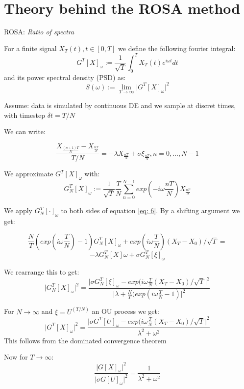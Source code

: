\documentclass[%
thesis=student,%
coverpage=false,%
titlepage=false,%
headmarks=true, %
german,%
font=libertine, %
math=newpxtx, %
BCOR=5mm,%
coverBCOR=11mm%
]{tumbook}
\begin{document}
\chapter{Theory behind the ROSA method}

ROSA: \textit{Ratio of spectra}

For a finite signal $X_{T}(t), t \in [0,T]$ we define the following fourier integral:
    \[
    G^{T}[X]_{\omega} := \frac{1}{\sqrt{T}}\int_{0}^{T}X_{T}(t)e^{i\omega t}dt
    \]
    and its power spectral density (PSD) as: 
    \[
    S(\omega) := \lim_{T\rightarrow\infty} \lvert G^{T}[X]_{\omega}\rvert ^2
    \]

Assume: data is simulated by continuous DE and we sample at discret times, with timestep $\delta t = T/N$

We can write: 
        
        \begin{equation}  
        \frac{X_{\frac{(n+1)T}{N}}-X_{\frac{nT}{N}}}{T/N} = -\lambda X_{\frac{nT}{N}} + \sigma \xi_{\frac{nT}{N}}, n = 0, \dots, N-1 \label{eq: 6}
        \end{equation}


We approximate $G^{T}[X]_{\omega}$ with: 
        \[
        G_{N}^{T}[X]_{\omega}:= \frac{1}{\sqrt{T}}\frac{T}{N}\sum_{n=0}^{N-1}exp(-i\omega\frac{nT}{N})X_{\frac{nT}{N}}
        \]


We apply $G_{N}^{T}[\cdot]_{\omega}$ to both sides of equation \ref{eq: 6}. By a shifting argument we get: 
        
    \[
    \frac{N}{T}(exp(i\omega\frac{T}{N})-1)G_{N}^{T}[X]_{\omega} + exp(i\omega\frac{T}{N})(X_{T}-X_{0})/\sqrt{T} = 
    \]
    \[
     -\lambda G_{N}^{T}[X]\omega + \sigma G_{N}^{T}[\xi]_{\omega}
    \]

We rearrange this to get:
    \[
    \lvert G_{N}^{T}[X]_{\omega}\rvert ^2 = \frac{\lvert \sigma G_{N}^{T}[\xi]_{\omega} - exp(i\omega\frac{T}{N}(X_{T}-X_{0})/\sqrt{T}\rvert ^2}{\lvert \lambda + \frac{N}{T}(exp(i\omega\frac{T}{N} - 1)\rvert^2}
    \]

For $N \rightarrow \infty$ and $\xi = U^{(T/N)}$  an OU process we get: 
        \[
        \lvert G^{T}[X]_{\omega} \rvert^2 = \frac{\lvert\sigma G^{T}[U]_{\omega} - exp(i\omega\frac{T}{N}(X_{T}-X_{0})/\sqrt{T}\rvert ^2}{\lambda^2 + \omega^2}
        \]
        This follows from the dominated convergence theorem


Now for $T \rightarrow \infty$:
     \[
        \frac{\lvert G[X]_{\omega} \rvert^2}{\lvert\sigma G[U]_{\omega}\rvert^2} = \frac{1}{\lambda^2 + \omega^2}
     \]
\end{document}
